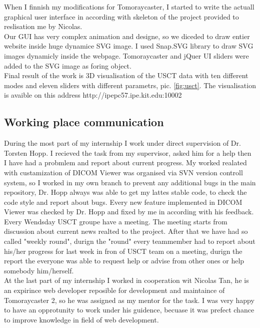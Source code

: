 \documentclass[english]{article}
\begin{document}
When I finnish my modifications for Tomoraycaster, I started to write the actuall graphical user interface in according with skeleton of the project provided to reslisation me by Nicolas.\\

Our GUI has very complex animation and designe, so we diceded to draw entier website inside huge dynamice SVG image. I used Snap.SVG library to draw SVG images dynamicly inside the webpage. Tomoraycaster and jQuer UI sliders were added to the SVG image as foring object.\\

Final result of the work is 3D visualisation of the USCT data with ten different modes and eleven sliders with different parametrs, pic. \ref{fig:usct}. The visualisation is avaible on this address http://ipepc57.ipe.kit.edu:10002

\subsection{Working place communication}

During the most part of my internship I work under direct supervision of Dr. Torsten Hopp. I recieved the task from my supervisor, asked him for a help then I have had a probmlem and report about current progress. My worked realated with custamization of DICOM Viewer was organised via SVN version controll system, so I worked in my own branch to prevent any additional bugs in the main repository, Dr. Hopp always was able to get my lattes stable code, to check the code style and report about bugs. Every new feature implemented in DICOM Viewer was checked by Dr. Hopp and fixed by me in according with his feedback.\\

Every Wendsday USCT groupe have a meeting. The meeting starts from discussion about current news realted to the project. After that we have had so called "weekly round", durign the "round" every teammember had to report about his/her progress for last week in fron of USCT team on a meeting, durign the report the everyone was able to request help or advise from other ones or help somebody him/herself. \\

At the last part of my internship I worked in cooperation wit Nicolas Tan, he is an expirince web developer reposible for development and maintaince of Tomoraycaster 2, so he was assigned as my mentor for the task. I was very happy to have an opprotunity to work under his guidence, becuase it was prefect chance to improve knowledge in field of web development.\\
\end{document}
